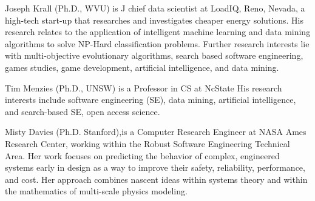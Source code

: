\documentclass[journal]{IEEEtran}
\begin{document}



\begin{IEEEbiography}{Joseph Krall}
(Ph.D., WVU)
is J chief data scientist at LoadIQ, Reno, Nevada, a high-tech start-up that researches and investigates cheaper energy solutions.
His research relates to the application of
intelligent machine learning and data mining algorithms to solve NP-Hard classification problems.
Further research interests lie with multi-objective evolutionary algorithms, 
search based software engineering, games studies, game development, artificial intelligence, and data mining.
\end{IEEEbiography}

\begin{IEEEbiography}{Tim Menzies} (Ph.D., UNSW)
is a Professor in CS at NcState  His research interests include software engineering (SE), data mining, artificial intelligence, and search-based SE, open access science. 
\end{IEEEbiography}


\begin{IEEEbiography}{Misty Davies}
(Ph.D. Stanford),is a Computer Research Engineer at
  NASA Ames Research Center, working within the
  Robust Software Engineering Technical Area.  Her
  work focuses on predicting the behavior of
  complex, engineered systems early in design as a
  way to improve their safety, reliability,
  performance, and cost. Her approach combines
  nascent ideas within systems theory and within the
  mathematics of multi-scale physics modeling.
\end{IEEEbiography}
 
\end{document}
